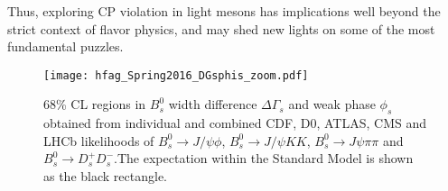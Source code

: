 \documentclass[a4paper,12pt]{article}%
\begin{document}
Thus, exploring CP violation in light mesons has implications well beyond the
strict context of flavor physics, and may shed new lights on some of the most
fundamental puzzles.

\begin{figure}[ptb]
\begin{center}
\texttt{[image: hfag\_Spring2016\_DGsphis\_zoom.pdf]}
\end{center}
\caption{68\% CL regions in $B^{0}_{s}$ width difference $\Delta\Gamma_{s}$
and weak phase $\phi_{s}$ obtained from individual and combined CDF, D0,
ATLAS, CMS and LHCb likelihoods of $B^{0}_{s}\to J/\psi\phi$, $B^{0}_{s}\to
J/\psi KK$, $B^{0}_{s}\to J\psi\pi\pi$ and $B^{0}_{s}\to D_{s}^{+}D_{s}^{-}%
$.The expectation within the Standard Model is shown as the black rectangle.}%
\label{figphis}%
\end{figure}
\end{document}
